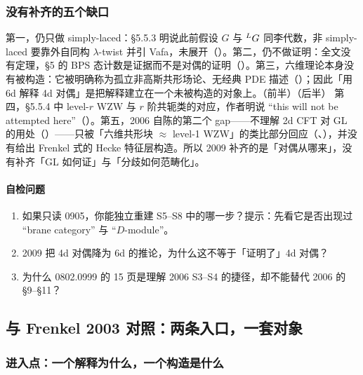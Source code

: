\subsubsection*{没有补齐的五个缺口}

第一，仍只做 simply-laced：§5.5.3 明说此前假设 $G$ 与 ${}^{L}G$ 同李代数，非 simply-laced 要靠外自同构 $\lambda$-twist 并引 Vafa，未展开（）。\pA 第二，仍不做证明：全文没有定理，§5 的 BPS 态计数是证据而不是对偶的证明（）。\pA 第三，六维理论本身没有被构造：它被明确称为孤立非高斯共形场论、无经典 PDE 描述（）；因此「用 6d 解释 4d 对偶」是把解释建立在一个未被构造的对象上。\pA（前半）\pC（后半） 第四，§5.5.4 中 level-$r$ WZW 与 $r$ 阶共轭类的对应，作者明说 ``this will not be attempted here''（）。\pA 第五，2006 自陈的第二个 gap——不理解 2d CFT 对 GL 的用处（）——只被「六维共形块 $\approx$ level-1 WZW」的类比部分回应（、），并没有给出 Frenkel 式的 Hecke 特征层构造。\pC 所以 2009 补齐的是「对偶从哪来」，没有补齐「GL 如何证」与「分歧如何范畴化」。\pC

\paragraph{自检问题}
\begin{enumerate}
\item 如果只读 0905，你能独立重建 S5--S8 中的哪一步？提示：先看它是否出现过 ``brane category'' 与 ``$D$-module''。\pC
\item 2009 把 4d 对偶降为 6d 的推论，为什么这不等于「证明了」4d 对偶？\pC
\item 为什么 0802.0999 的 15 页是理解 2006 S3--S4 的捷径，却不能替代 2006 的 §9--§11？\pC
\end{enumerate}

\subsection{与 Frenkel 2003 对照：两条入口，一套对象}
\label{sec:compare-frenkel}

\subsubsection*{进入点：一个解释为什么，一个构造是什么}

